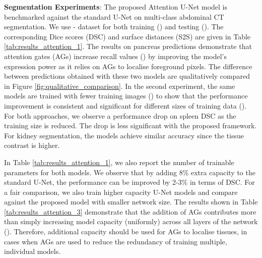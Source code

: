 \documentclass{article}
\begin{document}
\textbf{Segmentation Experiments}: The proposed Attention U-Net model is benchmarked against the standard U-Net on multi-class abdominal CT segmentation. We use - dataset for both training () and testing (). The corresponding Dice scores (DSC) and surface distances (S2S) are given in Table \ref{tab:results_attention_1}. The results on pancreas predictions demonstrate that attention gates (AGs) increase recall values () by improving the model's expression power as it relies on AGs to localise foreground pixels. The difference between predictions obtained with these two models are qualitatively compared in Figure \ref{fig:qualitative_comparison}. In the second experiment, the same models are trained with fewer training images () to show that the performance improvement is consistent and significant for different sizes of training data (). For both approaches, we observe a performance drop on spleen DSC as the training size is reduced. The drop is less significant with the proposed framework. For kidney segmentation, the models achieve similar accuracy since the tissue contrast is higher.
	
In Table \ref{tab:results_attention_1}, we also report the number of trainable parameters for both models. We observe that by adding 8\% extra capacity to the standard U-Net, the performance can be improved by 2-3\% in terms of DSC. For a fair comparison, we also train higher capacity U-Net models and compare against the proposed model with smaller network size. The results shown in Table \ref{tab:results_attention_3} demonstrate that the addition of AGs contributes more than simply increasing model capacity (uniformly) across all layers of the network (). Therefore, additional capacity should be used for AGs to localise tissues, in cases when AGs are used to reduce the redundancy of training multiple, individual models.
\end{document}
